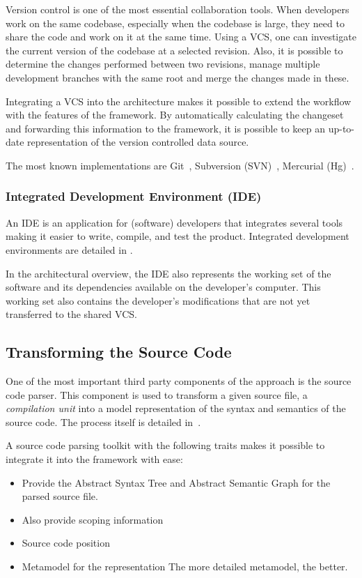 Version control is one of the most essential collaboration tools. When developers work on the same codebase, especially when the codebase is large, they need to share the code and work on it at the same time. Using a VCS, one can investigate the current version of the codebase at a selected revision. Also, it is possible to determine the changes performed between two revisions, manage multiple development branches with the same root and merge the changes made in these.

Integrating a VCS into the architecture makes it possible to extend the workflow with the features of the framework. By automatically calculating the changeset and forwarding this information to the framework, it is possible to keep an up-to-date representation of the version controlled data source.

The most known implementations are Git~\cite{git}, Subversion (SVN)~\cite{svn}, Mercurial (Hg)~\cite{hg}.

\subsubsection{Integrated Development Environment (IDE)}
An IDE is an application for (software) developers that integrates several tools making it easier to write, compile, and test the product. Integrated development environments are detailed in .

In the architectural overview, the IDE also represents the working set of the software and its dependencies available on the developer's computer. This working set also contains the developer's modifications that are not yet transferred to the shared VCS.


\subsection{Transforming the Source Code}
\label{sect:overview-transforming-the-source-code}
One of the most important third party components of the approach is the source code parser. This component is used to transform a given source file, a \emph{compilation unit} into a model representation of the syntax and semantics of the source code. The process itself is detailed in~.

A source code parsing toolkit with the following traits makes it possible to integrate it into the framework with ease:

\begin{itemize}[topsep=0pt]
  \item Provide the Abstract Syntax Tree and Abstract Semantic Graph for the parsed source file.

  \item Also provide scoping information

  \item Source code position

  \item Metamodel for the representation
  The more detailed metamodel, the better.
\end{itemize}

